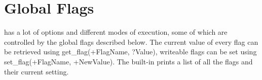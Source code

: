 %
% 
% 
% 
% 
%
%

\chapter{Global Flags}

{\eclipse} has a lot of options and different modes of execution,
some of which are controlled by the global flags described below.
The current value of every flag can be retrieved using
get_flag(+FlagName, ?Value), writeable flags can be set using
set_flag(+FlagName, +NewValue).
The built-in  prints a list of all the flags and their current
setting.


\newcommand{\idxnewitem}[1]{\index{#1}\item[#1]}


